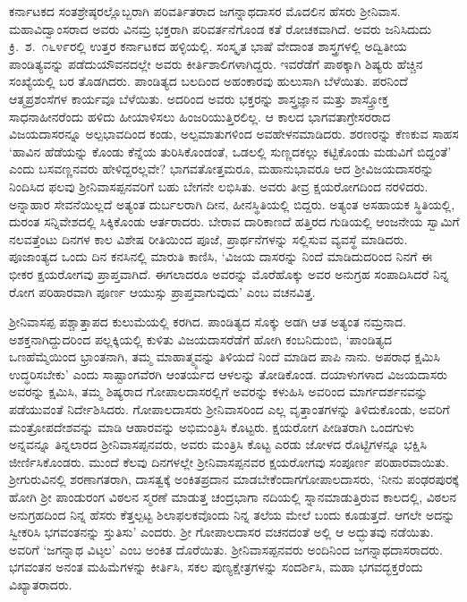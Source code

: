 
ಕರ್ನಾಟಕದ ಸಂತಶ್ರೇಷ್ಠರಲ್ಲೊಬ್ಬರಾಗಿ ಪರಿವರ್ತಿತರಾದ ಜಗನ್ನಾಥದಾಸರ ಮೊದಲಿನ ಹೆಸರು ಶ‍್ರೀನಿವಾಸ. ಮಹಾವಿದ್ವಾಂಸರಾದ ಅವರು ವಿನಮ್ರ ಭಕ್ತರಾಗಿ ಪರಿವರ್ತನೆಗೊಂಡ ಕತೆ ರೋಚಕವಾಗಿದೆ. ಅವರು ಜನಿಸಿದುದು ಕ್ರಿ.\ ಶ.\ ೧೬೪೯ರಲ್ಲಿ ಉತ್ತರ ಕರ್ನಾಟಕದ ಹಳ್ಳಿಯಲ್ಲಿ. ಸಂಸ್ಕೃತ ಭಾಷೆ ವೇದಾಂತ ಶಾಸ್ತ್ರಗಳಲ್ಲಿ ಅದ್ವಿತೀಯ ಪಾಂಡಿತ್ಯವನ್ನು ಪಡೆದು\break ಯೌವನದಲ್ಲೇ ಅವರು ಕೀರ್ತಿಶಾಲಿಗಳಾಗಿದ್ದರು. ಇವರೆಡೆಗೆ ಪಾಠಕ್ಕಾಗಿ ಶಿಷ್ಯರು ಹೆಚ್ಚಿನ ಸಂಖ್ಯೆಯಲ್ಲಿ ಬರ ತೊಡಗಿದರು. ಪಾಂಡಿತ್ಯದ ಬಲದಿಂದ ಅಹಂಕಾರವು ಹುಲುಸಾಗಿ ಬೆಳೆಯಿತು. ಪರನಿಂದೆ ಆತ್ಮಪ್ರಶಂಸೆಗಳ ಕಾರ್ಯವೂ ಬೆಳೆಯಿತು. ಅದರಿಂದ ಅವರು ಭಕ್ತರನ್ನು ಶಾಸ್ತ್ರಜ್ಞಾನ ಮತ್ತು ಶಾಸ್ತ್ರೋಕ್ತ ಸಾಧನಾಹೀನರೆಂದು ಹಳಿದು ಹೀಯಾಳಿಸಲು ಹಿಂಜರಿಯುತ್ತಿರಲಿಲ್ಲ. ಆ ಕಾಲದ ಭಾಗವತಾಗ್ರೇಸರರಾದ ವಿಜಯದಾಸರನ್ನೂ ಅಲ್ಪಭಾವದಿಂದ ಕಂಡು, ಅಲ್ಪಮಾತುಗಳಿಂದ ಅವಹೇಳನಮಾಡಿದರು. ಶರಣರನ್ನು ಕೆಣಕುವ ಸಾಹಸ ‘ಹಾವಿನ ಹೆಡೆಯನ್ನು ಕೊಂಡು ಕೆನ್ನೆಯ ತುರಿಸಿಕೊಂಡಂತೆ, ಒಡಲಲ್ಲಿ ಸುಣ್ಣದಕಲ್ಲು ಕಟ್ಟಿಕೊಂಡು ಮಡುವಿಗೆ ಬಿದ್ದಂತೆ’ ಎಂದು ಬಸವಣ್ಣನವರು ಹೇಳಿದ್ದರಲ್ಲವೇ? ಭಾಗವತೋತ್ತಮರೂ, ಮಹಾನುಭಾವರೂ ಆದ ಶ‍್ರೀವಿಜಯದಾಸರನ್ನು ನಿಂದಿಸಿದ ಫಲವು ಶ‍್ರೀನಿವಾಸಪ್ಪನವರಿಗೆ ಬಹು ಬೇಗನೇ ಲಭಿಸಿತು. ಅವರು ತೀವ್ರ ಕ್ಷಯರೋಗದಿಂದ ನರಳಿದರು. ಅನ್ನಾಹಾರ ಸೇವನೆಯಿಲ್ಲದೆ ಅತ್ಯಂತ ದುರ್ಬಲರಾಗಿ ದೀನ, ಹೀನಸ್ಥಿತಿಯಲ್ಲಿ ಬಿದ್ದರು. ಅತ್ಯಂತ ಅಸಹಾಯಕ ಸ್ಥಿತಿಯಲ್ಲಿ, ದುರಂತ ಸನ್ನಿವೇಶದಲ್ಲಿ ಸಿಕ್ಕಿಕೊಂಡು ಆರ್ತರಾದರು. ಬೇರಾವ ದಾರಿಕಾಣದೆ ಹತ್ತಿರದ ಗುಡಿಯಲ್ಲಿ ಆಂಜನೇಯ ಸ್ವಾಮಿಗೆ ನಲವತ್ತೆಂಟು ದಿನಗಳ ಕಾಲ ವಿಶೇಷ ರೀತಿಯಿಂದ ಪೂಜೆ, ಪ್ರಾರ್ಥನೆಗಳನ್ನು ಸಲ್ಲಿಸುವ ವ್ಯವಸ್ಥೆ ಮಾಡಿದರು. ಪೂಜಾಂತ್ಯದ ಒಂದು ದಿನ ಕನಸಿನಲ್ಲಿ ಮಾರುತಿ ಕಾಣಿಸಿ, ‘ವಿಜಯ ದಾಸರನ್ನು ನಿಂದೆ ಮಾಡಿದುದರಿಂದ ನಿನಗೆ ಈ ಭೀಕರ ಕ್ಷಯರೋಗವು ಪ್ರಾಪ್ತವಾಗಿದೆ. ಈಗಲಾದರೂ ಅವರನ್ನು ಮೊರೆಹೊಕ್ಕು ಅವರ ಅನುಗ್ರಹ ಸಂಪಾದಿಸಿದರೆ ನಿನ್ನ ರೋಗ ಪರಿಹಾರವಾಗಿ ಪೂರ್ಣ ಆಯುಸ್ಸು ಪ್ರಾಪ್ತವಾಗುವುದು’ ಎಂಬ ವಚನವಿತ್ತ.

ಶ‍್ರೀನಿವಾಸಪ್ಪ ಪಶ್ಚಾತ್ತಾಪದ ಕುಲುಮೆಯಲ್ಲಿ ಕರಗಿದ. ಪಾಂಡಿತ್ಯದ ಸೊಕ್ಕು ಅಡಗಿ ಆತ ಅತ್ಯಂತ ನಮ್ರನಾದ. ಅಶಕ್ತನಾಗಿದ್ದುದರಿಂದ ಪಲ್ಲಕ್ಕಿಯಲ್ಲಿ ಕುಳಿತು ವಿಜಯದಾಸರೆಡೆಗೆ ಹೋಗಿ ಕಂಬನಿದುಂಬಿ, ‘ಪಾಂಡಿತ್ಯದ ಒಣಹೆಮ್ಮೆಯಿಂದ ಭ್ರಾಂತನಾಗಿ, ತಮ್ಮ ಮಾಹಾತ್ಮ್ಯವನ್ನು ತಿಳಿಯದೆ ನಿಂದೆ ಮಾಡಿದ ಪಾಪಿ ನಾನು. ಅಪರಾಧ ಕ್ಷಮಿಸಿ ಉದ್ಧರಿಸಬೇಕು’ ಎಂದು ಸಾಷ್ಟಾಂಗವೆರಗಿ ಆಂತರ್ಯದ ಆಳಲನ್ನು ತೋಡಿಕೊಂಡ. ದಯಾಳುಗಳಾದ ವಿಜಯದಾಸರು ಅವರನ್ನು ಕ್ಷಮಿಸಿ, ತಮ್ಮ ಶಿಷ್ಯರಾದ ಗೋಪಾಲದಾಸರಲ್ಲಿಗೆ ಅವರನ್ನು ಕಳುಹಿಸಿ ಅವರಿಂದ ಮಾರ್ಗದರ್ಶನವನ್ನು ಪಡೆಯುವಂತೆ ನಿರ್ದೇಶಿಸಿದರು. ಗೋಪಾಲದಾಸರು ಶ‍್ರೀನಿವಾಸರಿಂದ ಎಲ್ಲ ವೃತ್ತಾಂತಗಳನ್ನು ತಿಳಿದುಕೊಂಡು, ಅವರಿಗೆ ಮಂತ್ರೋಪದೇಶವನ್ನು ಮಾಡಿ ಆಹಾರವನ್ನು ಅಭಿಮಂತ್ರಿಸಿ ಕೊಟ್ಟರು. ಕ್ಷಯರೋಗ ಪೀಡಿತರಾಗಿ ಒಂದಗುಳು ಅನ್ನವನ್ನೂ ತಿನ್ನಲಾರದ ಶ‍್ರೀನಿವಾಸಪ್ಪನವರು, ಅವರು ಮಂತ್ರಿಸಿ ಕೊಟ್ಟ ಎರಡು ಜೋಳದ ರೊಟ್ಟಿಗಳನ್ನೂ ಭಕ್ಷಿಸಿ ಜೀರ್ಣಿಸಿಕೊಂಡರು. ಮುಂದೆ ಕೆಲವು ದಿನಗಳಲ್ಲೇ ಶ‍್ರೀನಿವಾಸಪ್ಪನವರ ಕ್ಷಯರೋಗವು ಸಂಪೂರ್ಣ ಪರಿಹಾರವಾಯಿತು. ಶ‍್ರೀಗುರುವಿನಲ್ಲಿ ಶರಣಾಗತರಾಗಿ, ದಾಸತ್ವಕ್ಕೆ ಅಂಕಿತಪ್ರದಾನ ಮಾಡಬೇಕೆಂದಾಗ\break ಗೋಪಾಲದಾಸರು, ‘ನೀನು ಪಂಢರಪುರಕ್ಕೆ ಹೋಗಿ ಶ‍್ರೀ ಪಾಂಡುರಂಗ ವಿಠಲನ ಸ್ಮರಣೆ ಮಾಡುತ್ತ ಚಂದ್ರಭಾಗಾ ನದಿಯಲ್ಲಿ ಸ್ನಾನಮಾಡುತ್ತಿರುವ ಕಾಲದಲ್ಲಿ, ವಿಠಲನ ಅನುಗ್ರಹದಿಂದ ನಿನ್ನ ಹೆಸರು ಕೆತ್ತಲ್ಪಟ್ಟ ಶಿಲಾಫಲಕವೊಂದು ನಿನ್ನ ತಲೆಯ ಮೇಲೆ ಬಂದು ಕೂಡುತ್ತದೆ. ಆಗಲೇ ಅದನ್ನು ಸ್ವೀಕರಿಸಿ ಭಗವಂತನನ್ನು ಸ್ತುತಿಸು’ ಎಂದರು. ಶ‍್ರೀ ಗೋಪಾಲದಾಸರ ವಚನದಂತೆ ಅಲ್ಲಿ ಆ ಅದ್ಭುತವು ನಡೆಯಿತು. ಅವರಿಗೆ ‘ಜಗನ್ನಾಥ ವಿಟ್ಠಲ’ ಎಂಬ ಅಂಕಿತ ದೊರೆಯಿತು. ಶ‍್ರೀನಿವಾಸಪ್ಪನವರು ಅಂದಿನಿಂದ ಜಗನ್ನಾಥದಾಸರಾದರು. ಭಗವಂತನ ಅನಂತ ಮಹಿಮೆಗಳನ್ನು ಕೀರ್ತಿಸಿ, ಸಕಲ ಪುಣ್ಯಕ್ಷೇತ್ರಗಳನ್ನು ಸಂದರ್ಶಿಸಿ, ಮಹಾ ಭಗವದ್ಭಕ್ತರೆಂದು ವಿಖ್ಯಾತ\-ರಾದರು.

